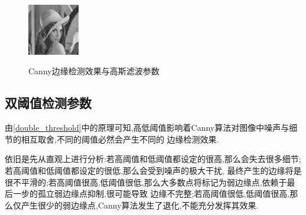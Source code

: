 \documentclass[a4paper]{article}
\begin{document}
\begin{figure}[H]
{\includegraphics[width=0.2\textwidth]{img/gaussian/size5sigma2/1.png}}
\caption{Canny边缘检测效果与高斯滤波参数}
\label{guassian_parameters}
\end{figure}
    \subsection{双阈值检测参数}
由\ref{double_threshold}中的原理可知,高低阈值影响着Canny算法对图像中噪声与细节的相互取舍,不同的阈值必然会产生不同的
边缘检测效果.

依旧是先从直观上进行分析:若高阈值和低阈值都设定的很高,那么会失去很多细节;若高阈值和低阈值都设定的很低,那么会受到噪声的极大干扰,
最终产生的边缘将是很不平滑的;若高阈值很高,低阈值很低,那么大多数点将标记为弱边缘点,依赖于最后一步的孤立弱边缘点抑制,很可能导致
边缘不完整;若高阈值很低,低阈值很高,那么仅产生很少的弱边缘点,Canny算法发生了退化,不能充分发挥其效果.
\end{document}
